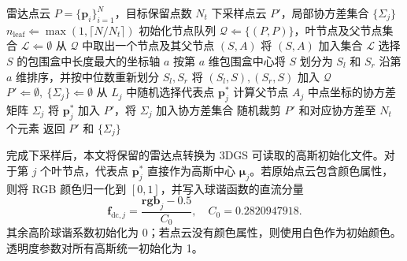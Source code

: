 {    \begin{algorithm}[!htbp]
        \caption{基于 K-d tree 叶节点代表点的雷达点云下采样}
        \label{alg:method-kdtree-downsample}
        \begin{algorithmic}[1]
            \REQUIRE 雷达点云 \(P=\{\mathbf{p}_i\}_{i=1}^{N}\)，目标保留点数 \(N_t\)
            \ENSURE 下采样点云 \(P'\)，局部协方差集合 \(\{\Sigma_j\}\)
            \STATE \(n_{\mathrm{leaf}}\Leftarrow \max(1,\lceil N/N_t\rceil)\)
            \STATE 初始化节点队列 \(\mathcal{Q}\Leftarrow\{(P,P)\}\)，叶节点及父节点集合 \(\mathcal{L}\Leftarrow\emptyset\)
                \STATE 从 \(\mathcal{Q}\) 中取出一个节点及其父节点 \((S,A)\)
                    \STATE 将 \((S,A)\) 加入集合 \(\mathcal{L}\)
                \ELSE
                    \STATE 选择 \(S\) 的包围盒中长度最大的坐标轴 \(a\)
                    \STATE 按第 \(a\) 维包围盒中心将 \(S\) 划分为 \(S_l\) 和 \(S_r\)
                        \STATE 沿第 \(a\) 维排序，并按中位数重新划分 \(S_l,S_r\)
                    \ENDIF
                    \STATE 将 \((S_l,S),(S_r,S)\) 加入 \(\mathcal{Q}\)
                \ENDIF
            \ENDWHILE
            \STATE \(P'\Leftarrow\emptyset,\ \{\Sigma_j\}\Leftarrow\emptyset\)
                \STATE 从 \(L_j\) 中随机选择代表点 \(\mathbf{p}_j^\ast\)
                \STATE 计算父节点 \(A_j\) 中点坐标的协方差矩阵 \(\Sigma_j\)
                \STATE 将 \(\mathbf{p}_j^\ast\) 加入 \(P'\)，将 \(\Sigma_j\) 加入协方差集合
            \ENDFOR
                \STATE 随机裁剪 \(P'\) 和对应协方差至 \(N_t\) 个元素
            \ENDIF
            \STATE 返回 \(P'\) 和 \(\{\Sigma_j\}\)
        \end{algorithmic}
    \end{algorithm}

    完成下采样后，本文将保留的雷达点转换为 3DGS 可读取的高斯初始化文件。对于第 \(j\) 个叶节点，代表点 \(\mathbf{p}_j^\ast\) 直接作为高斯中心 \(\mathbf{\mu}_j\)。若原始点云包含颜色属性，则将 RGB 颜色归一化到 \([0,1]\)，并写入球谐函数的直流分量
    \begin{equation}
        \label{equ:method-lidar-sh-dc}
        \mathbf{f}_{\mathrm{dc},j}
        =
        \frac{\mathbf{rgb}_j-0.5}{C_0},
        \quad
        C_0=0.2820947918.
    \end{equation}
    其余高阶球谐系数初始化为 0；若点云没有颜色属性，则使用白色作为初始颜色。透明度参数对所有高斯统一初始化为 1。

}
